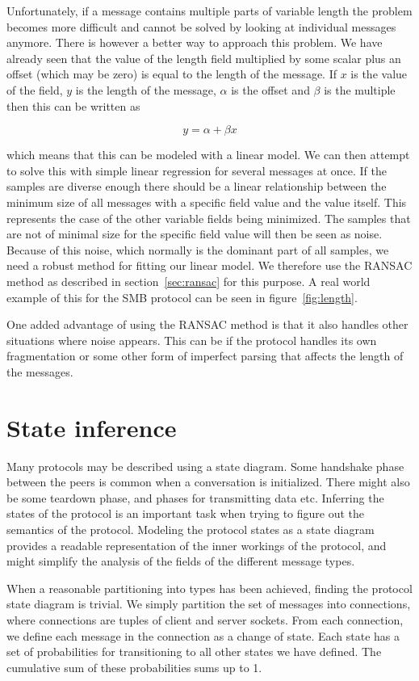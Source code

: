 \documentclass[a4paper]{report}
\begin{document}
Unfortunately, if a message contains multiple parts of variable length the
problem becomes more difficult and cannot be solved by looking at individual
messages anymore. There is however a better way to approach this problem. We
have already seen that the value of the length field multiplied by some scalar
plus an offset (which may be zero) is equal to the length of the message. If
$x$ is the value of the field, $y$ is the length of the message, $\alpha$ is the
offset and $\beta$ is the multiple then this can be written as

\[
    y = \alpha + \beta x
    \label{eq:linlength}
\]

which means that this can be modeled with a linear model. We can then attempt
to solve this with simple linear regression for several messages at once. If
the samples are diverse enough there should be a linear relationship between
the minimum size of all messages with a specific field value and the value
itself. This represents the case of the other variable fields being minimized.
The samples that are not of minimal size for the specific field value will then
be seen as noise. Because of this noise, which normally is the dominant part of
all samples, we need a robust method for fitting our linear model. We therefore
use the RANSAC method as described in section~\ref{sec:ransac} for this
purpose. A real world example of this for the SMB protocol can be seen in
figure~\ref{fig:length}.

One added advantage of using the RANSAC method is that it also handles other
situations where noise appears. This can be if the protocol handles its own
fragmentation or some other form of imperfect parsing that affects the length
of the messages.

\section{State inference}
Many protocols may be described using a state diagram. Some handshake phase
between the peers is common when a conversation is initialized. There might
also be some teardown phase, and phases for transmitting data etc.
Inferring the states of the protocol is an important task when trying to
figure out the semantics of the protocol. Modeling the protocol states as
a state diagram provides a readable representation of the inner workings
of the protocol, and might simplify the analysis of the fields of the
different message types.

When a reasonable partitioning into types has been achieved, finding the
protocol state diagram is trivial. We simply partition the set of messages
into connections, where connections are tuples of client and server sockets.
From each connection, we define each message in the connection as a change
of state. Each state has a set of probabilities for transitioning to
all other states we have defined. The cumulative sum of these probabilities
sums up to 1.
\end{document}
